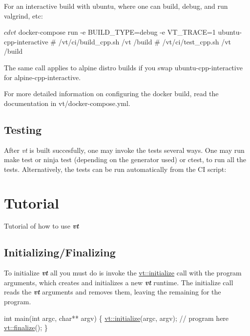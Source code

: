 For an interactive build with ubuntu, where one can build, debug, and run {\ttfamily valgrind}, etc\+:


\begin{DoxyCode}
$ cd vt
$ docker-compose run -e BUILD\_TYPE=debug -e VT\_TRACE=1 ubuntu-cpp-interactive
# /vt/ci/build\_cpp.sh /vt /build
# /vt/ci/test\_cpp.sh /vt /build
\end{DoxyCode}


The same call applies to alpine distro builds if you swap {\ttfamily ubuntu-\/cpp-\/interactive} for {\ttfamily alpine-\/cpp-\/interactive}.

For more detailed information on configuring the docker build, read the documentation in {\ttfamily vt/docker-\/compose.\+yml}.\hypertarget{vt-build_test-vt}{}\subsection{Testing}\label{vt-build_test-vt}
After {\itshape vt} is built succesfully, one may invoke the tests several ways. One may run {\ttfamily make test} or {\ttfamily ninja test} (depending on the generator used) or {\ttfamily ctest}, to run all the tests. Alternatively, the tests can be run automatically from the CI script\+:


 \hypertarget{tutorial}{}\section{Tutorial}\label{tutorial}
Tutorial of how to use {\bfseries {\itshape vt}}\hypertarget{tutorial_tutorial-init-finalize-vt}{}\subsection{Initializing/\+Finalizing}\label{tutorial_tutorial-init-finalize-vt}
To initialize {\bfseries {\itshape vt}} all you must do is invoke the {\ttfamily \hyperlink{namespacevt_aaa266774ea8339c58be0202b00fafa62}{vt\+::initialize}} call with the program arguments, which creates and initializes a new {\bfseries {\itshape vt}} runtime. The initialize call reads the {\bfseries {\itshape vt}} arguments and removes them, leaving the remaining for the program.


\begin{DoxyCode}
\textcolor{keywordtype}{int} main(\textcolor{keywordtype}{int} argc, \textcolor{keywordtype}{char}** argv) \{
  \hyperlink{namespacevt_aaa266774ea8339c58be0202b00fafa62}{vt::initialize}(argc, argv);
   \textcolor{comment}{// program here}
  \hyperlink{namespacevt_a540d90dbd6e97b69f1dcbc9ee9314cff}{vt::finalize}();
\}
\end{DoxyCode}


